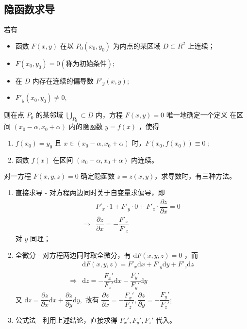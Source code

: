 \subsection{隐函数求导}

\begin{Theo}[隐函数存在定理]

    若有
    \begin{itemize}
        \item 函数 $ F(x,y) $ 在以 $ P_0(x_0,y_0) $ 为内点的某区域 $ D\subset R^2 $ 上连续；
        \item $ F(x_0,y_0) = 0 (\textrm{称为初始条件}); $ 
        \item 在 $ D $ 内存在连续的偏导数 $ F'_y(x,y); $ 
        \item $ F'_y(x_0,y_0)\neq0, $ 
    \end{itemize}
    则在点 $ P_0 $ 的某邻域 $ \bigcup_{P_0}\subset D $ 内，方程 $ F(x,y)=0 $ 唯一地确定一个定义
    在区间 $ (x_0-\alpha,x_0+\alpha) $ 内的隐函数 $ y = f(x) $ ，使得
    \begin{enumerate}
        \item $ f(x_0) = y_0 $ 且 $ x\in (x_0-\alpha,x_0+\alpha) $ 时，$ F(x_0,f(x_0)) \equiv 0 $ ;
        \item 函数 $ f(x) $ 在区间 $ (x_0-\alpha,x_0+\alpha) $ 内连续。
    \end{enumerate}
\end{Theo}

对一方程 $ F(x,y,z) = 0 $ 确定隐函数 $ z = z(x,y) $，求导数时，有三种方法。

\begin{enumerate}
    \item 直接求导 - 对方程两边同时关于自变量求偏导，即\begin{equation*}
        \begin{aligned}
            &F'_x \cdot 1 + F'_y \cdot 0 + F'_z \cdot \dfrac{\partial z}{\partial x} = 0\\
            \Rightarrow & \dfrac{\partial z}{\partial x} = -\dfrac{F'_x}{F'_z}
        \end{aligned}
    \end{equation*}
    对 $ y $ 同理；
    \item 全微分 - 对方程两边同时取全微分，有 $ \mathrm{d}F(x,y,z) = 0 $ ，而\begin{equation*}
        \begin{aligned}
            &\mathrm{d}F(x,y,z) = F'_x \mathrm{d}x + F'_y \mathrm{d}y + F'_z\mathrm{d}z\\ 
            \Rightarrow & \mathrm{d}z = -\dfrac{F_x'}{F_z'}\mathrm{d}x - \dfrac{F_y'}{F_y'}\mathrm{d}y
        \end{aligned}
    \end{equation*}
    又 $ \mathrm{d}z = \dfrac{\partial z}{\partial x}\mathrm{d}x + \dfrac{\partial z}{\partial y}\mathrm{d}y, $ 
    故有 $ \dfrac{\partial z}{\partial x} = -\dfrac{F_x'}{F_z'},
    \dfrac{\partial z}{\partial y} = -\dfrac{F_y'}{F_z'}$;
    \item 公式法 - 利用上述结论，直接求得 $ F_x',F_y',F_z' $ 代入。
\end{enumerate}

